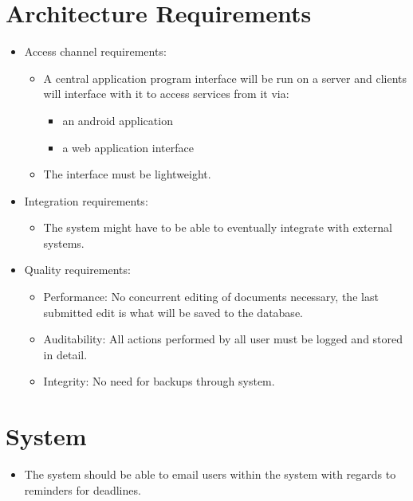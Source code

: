 \documentclass{article}
\begin{document}
\section{Architecture Requirements}\label{sec:architecture}
	\begin{itemize}
		\item Access channel requirements:
		\begin{itemize}
			\item A central application program interface will be run on a server and clients will interface with it to access services from it via:
			\begin{itemize}
				\item an android application
				\item a web application interface
			\end{itemize}
			\item The interface must be lightweight.
		\end{itemize}
		\item Integration requirements:
		\begin{itemize}
			\item The system might have to be able to eventually integrate with external systems.
		\end{itemize}
		\item Quality requirements:
		\begin{itemize}
			\item Performance: No concurrent editing of documents necessary, the last submitted edit is what will be saved to the database.
			\item Auditability: All actions performed by all user must be logged and stored in detail.
			\item Integrity: No need for backups through system.
		\end{itemize}
	\end{itemize}

\section{System}\label{sec:system}
	\begin{itemize}
		\item The system should be able to email users within the system with regards to reminders for deadlines.
	\end{itemize}
\end{document}
